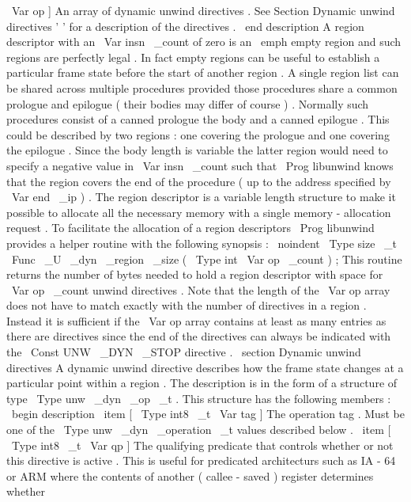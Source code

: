 \
Var
{
op
}
]
An
array
of
dynamic
unwind
directives
.
See
Section
Dynamic
unwind
directives
'
'
for
a
description
of
the
directives
.
\
end
{
description
}
A
region
descriptor
with
an
\
Var
{
insn
\
_count
}
of
zero
is
an
\
emph
{
empty
region
}
and
such
regions
are
perfectly
legal
.
In
fact
empty
regions
can
be
useful
to
establish
a
particular
frame
state
before
the
start
of
another
region
.
A
single
region
list
can
be
shared
across
multiple
procedures
provided
those
procedures
share
a
common
prologue
and
epilogue
(
their
bodies
may
differ
of
course
)
.
Normally
such
procedures
consist
of
a
canned
prologue
the
body
and
a
canned
epilogue
.
This
could
be
described
by
two
regions
:
one
covering
the
prologue
and
one
covering
the
epilogue
.
Since
the
body
length
is
variable
the
latter
region
would
need
to
specify
a
negative
value
in
\
Var
{
insn
\
_count
}
such
that
\
Prog
{
libunwind
}
knows
that
the
region
covers
the
end
of
the
procedure
(
up
to
the
address
specified
by
\
Var
{
end
\
_ip
}
)
.
The
region
descriptor
is
a
variable
length
structure
to
make
it
possible
to
allocate
all
the
necessary
memory
with
a
single
memory
-
allocation
request
.
To
facilitate
the
allocation
of
a
region
descriptors
\
Prog
{
libunwind
}
provides
a
helper
routine
with
the
following
synopsis
:
\
noindent
\
Type
{
size
\
_t
}
\
Func
{
\
_U
\
_dyn
\
_region
\
_size
}
(
\
Type
{
int
}
\
Var
{
op
\
_count
}
)
;
This
routine
returns
the
number
of
bytes
needed
to
hold
a
region
descriptor
with
space
for
\
Var
{
op
\
_count
}
unwind
directives
.
Note
that
the
length
of
the
\
Var
{
op
}
array
does
not
have
to
match
exactly
with
the
number
of
directives
in
a
region
.
Instead
it
is
sufficient
if
the
\
Var
{
op
}
array
contains
at
least
as
many
entries
as
there
are
directives
since
the
end
of
the
directives
can
always
be
indicated
with
the
\
Const
{
UNW
\
_DYN
\
_STOP
}
directive
.
\
section
{
Dynamic
unwind
directives
}
A
dynamic
unwind
directive
describes
how
the
frame
state
changes
at
a
particular
point
within
a
region
.
The
description
is
in
the
form
of
a
structure
of
type
\
Type
{
unw
\
_dyn
\
_op
\
_t
}
.
This
structure
has
the
following
members
:
\
begin
{
description
}
\
item
[
\
Type
{
int8
\
_t
}
\
Var
{
tag
}
]
The
operation
tag
.
Must
be
one
of
the
\
Type
{
unw
\
_dyn
\
_operation
\
_t
}
values
described
below
.
\
item
[
\
Type
{
int8
\
_t
}
\
Var
{
qp
}
]
The
qualifying
predicate
that
controls
whether
or
not
this
directive
is
active
.
This
is
useful
for
predicated
architecturs
such
as
IA
-
64
or
ARM
where
the
contents
of
another
(
callee
-
saved
)
register
determines
whether
